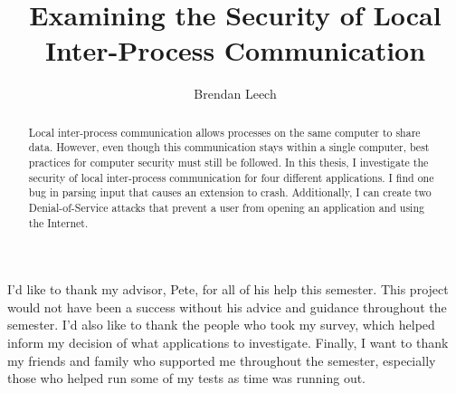 \documentclass[midd]{thesis}
\title {Examining the Security of Local Inter-Process Communication}
\author {Brendan Leech}
\begin{document}
\maketitle
{}

\begin{abstract}
Local inter-process communication allows processes on the same computer to share data.  However, even though this communication stays within a single computer, best practices for computer security must still be followed.  In this thesis, I investigate the security of local inter-process communication for four different applications.  I find one bug in parsing input that causes an extension to crash.  Additionally, I can create two Denial-of-Service attacks that prevent a user from opening an application and using the Internet.
\end{abstract}

\begin{acknowledgements}
I'd like to thank my advisor, Pete, for all of his help this semester.  This project would not have been a success without his advice and guidance throughout the semester.  I'd also like to thank the people who took my survey, which helped inform my decision of what applications to investigate.  Finally, I want to thank my friends and family who supported me throughout the semester, especially those who helped run some of my tests as time was running out.
\end{acknowledgements}

\contentspage
\tablelistpage   %
\figurelistpage

\normalspacing \setcounter{page}{1} 









\appendix






\end{document}
